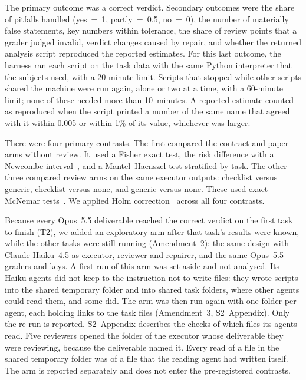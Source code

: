 \documentclass[10pt,letterpaper]{article}
\begin{document}
The primary outcome was a correct verdict. Secondary outcomes were the
share of pitfalls handled (yes~=~1, partly~=~0.5, no~=~0), the number of
materially false statements, key numbers within tolerance, the share of
review points that a grader judged invalid, verdict changes caused by
repair, and whether the returned analysis script reproduced the reported
estimates. For this last outcome, the harness ran each script on the
task data with the same Python interpreter that the subjects used, with a
20-minute limit. Scripts that stopped while other scripts shared the
machine were run again, alone or two at a time, with a 60-minute limit;
none of these needed more than 10~minutes. A reported estimate counted as
reproduced when the script printed a number of the same name that agreed
with it within 0.005 or within 1\% of its value, whichever was larger.

There were four primary contrasts. The first compared the contract and
paper arms without review. It used a Fisher exact test, the risk
difference with a Newcombe interval~\cite{newcombe1998interval}, and a
Mantel--Haenszel test stratified by task. The other three compared review
arms on the same executor outputs: checklist versus generic, checklist
versus none, and generic versus none. These used exact McNemar
tests~\cite{mcnemar1947note}. We applied Holm
correction~\cite{holm1979simple} across all four contrasts.

Because every Opus~5.5 deliverable reached the correct verdict on the
first task to finish (T2), we added an exploratory arm after that task's
results were known, while the other tasks were still running
(Amendment~2): the same design with Claude Haiku~4.5 as executor, reviewer
and repairer, and the same Opus~5.5 graders and keys. A first run of this
arm was set aside and not analysed. Its Haiku agents did not keep to the
instruction not to write files: they wrote scripts into the shared
temporary folder and into shared task folders, where other agents could
read them, and some did. The arm was then run again with one folder per agent, each holding
links to the task files (Amendment~3, S2~Appendix). Only the re-run is
reported. S2~Appendix describes the checks of which files its agents
read. Five reviewers opened the folder of the executor whose deliverable
they were reviewing, because the deliverable named it. Every read of a
file in the shared temporary folder was of a file that the reading agent
had written itself. The arm is reported separately and does not enter the
pre-registered contrasts.
\end{document}
